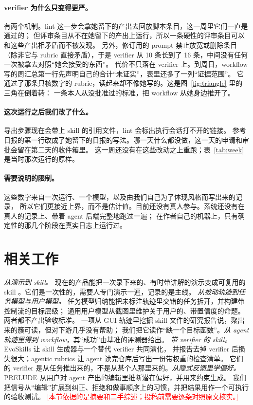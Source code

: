 \documentclass[10pt,UTF8,scheme=plain]{ctexart}
\newcommand{\todo}[1]{\textcolor{red}{[#1]}}
\begin{document}
\paragraph{verifier 为什么只变得更严。} 有两个机制。lint 这一步会拿她留下的产出去回放脚本条目，这一周里它们一直是通过的；
但评审条目从不在她留下的产出上运行，所以一条硬性的评审条目可以和这些产出相矛盾而不被发现。
另外，修订用的 prompt 禁止放宽或删除条目（除非它与 rubric 直接矛盾），于是 verifier 从 10 条长到了 16 条，中间没有任何一次被拿去对照“她会接受的东西”。
代价不只落在 verifier 上。到周日，workflow 写的周汇总第一行先声明自己的合计“未证实”，表里还多了一列“证据范围”。
它通过了那条只核数字的 rubric，读起来却不像她写的。这是图~\ref{fig:triangle} 里的三角在倒着转：
一条本人从没批准过的标准，把 workflow 从她身边推开了。

\paragraph{这次运行之后我们改了什么。} 导出步骤现在会带上 skill 的引用文件，lint 会标出执行会话打不开的链接。
参考日报的第一行改成了她留下的日报的写法。哪一天什么都没做，这一天的申请和审批会留在第二天的收件箱里。
这一周还没有在这些改动之上重跑；表~\ref{tab:week} 是当时那次运行的原样。

\paragraph{需要说明的限制。} 这些数字来自一次运行、一个模型，以及由我们自己为了体现风格而写出来的记录，
所以它们更接近上界，而不是估计值。目前还没有真人参与。系统还没有在真人的记录上、带着 agent 后端完整地跑过一遍；
在作者自己的机器上，只有确定性的那几个阶段在真实日志上运行过。

\section{相关工作}
\label{sec:related}

\emph{从演示到 skill。} 现在的产品能把一次录下来的、有时带讲解的演示变成可复用的 skill
\cite{recordskill,recordreplay,skillrecorder}。它们是一次性的，需要人专门演示一遍，记录的是主线。
\emph{从被动轨迹到任务模型与用户模型。} 任务模型归纳\cite{tmi}能把未标注轨迹里交错的任务拆开，并构建带控制流的目标层级；
通用用户模型\cite{gum}从截图里维护关于用户的、带置信度的命题。两者都不产出验收标准。
一项从 GUI 轨迹里挖掘 skill 文件的研究报告说，聚出来的簇可读，但对下游几乎没有帮助\cite{skillmd}；
我们把它读作“缺一个目标函数”。\emph{从 agent 轨迹里得到 workflow}\cite{awm}，其“成功”由基准的评测器给出。
\emph{带 verifier 的 skill。} EvoSkills\cite{evoskills} 让 skill 生成器与一个替代 verifier 共同演化，
并报告去掉 verifier 后损失很大；agentic rubrics\cite{rubrics} 让 agent 读完仓库后写出一份带权重的检查清单。
它们的 verifier 是从任务推出来的，不是从某个人那里来的。\emph{从隐式反馈里学偏好。}
PRELUDE\cite{prelude} 从用户对 agent 产出的编辑里推断潜在偏好，并用来约束生成。
我们把信号从“编辑”扩展到纠正、拒绝和做事顺序上的习惯，并把结果用作一个可执行的验收测试。
\todo{本节依据的是摘要和二手综述；投稿前需要逐条对照原文核实。}
\end{document}

